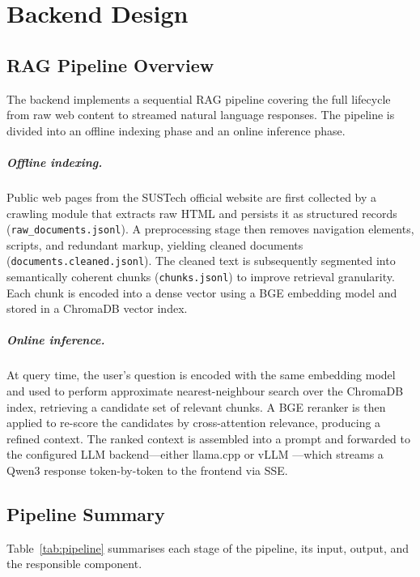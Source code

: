 \chapter{Backend Design}
\section{RAG Pipeline Overview}

The backend implements a sequential RAG pipeline covering the full lifecycle from raw web content to streamed natural language responses. The pipeline is divided into an offline indexing phase and an online inference phase.

\paragraph{Offline indexing.}
Public web pages from the SUSTech official website are first collected by a crawling module that extracts raw HTML and persists it as structured records (\texttt{raw\_documents.jsonl}). A preprocessing stage then removes navigation elements, scripts, and redundant markup, yielding cleaned documents (\texttt{documents.cleaned.jsonl}). The cleaned text is subsequently segmented into semantically coherent chunks (\texttt{chunks.jsonl}) to improve retrieval granularity. Each chunk is encoded into a dense vector using a BGE embedding model \parencite{bge2024} and stored in a ChromaDB \parencite{chromadb} vector index.

\paragraph{Online inference.}
At query time, the user's question is encoded with the same embedding model and used to perform approximate nearest-neighbour search over the ChromaDB index, retrieving a candidate set of relevant chunks. A BGE reranker \parencite{bge2024} is then applied to re-score the candidates by cross-attention relevance, producing a refined context. The ranked context is assembled into a prompt and forwarded to the configured LLM backend—either llama.cpp \parencite{llamacpp} or vLLM \parencite{vllm2023}—which streams a Qwen3 \parencite{qwen2025} response token-by-token to the frontend via SSE.

\section{Pipeline Summary}

Table~\ref{tab:pipeline} summarises each stage of the pipeline, its input, output, and the responsible component.

